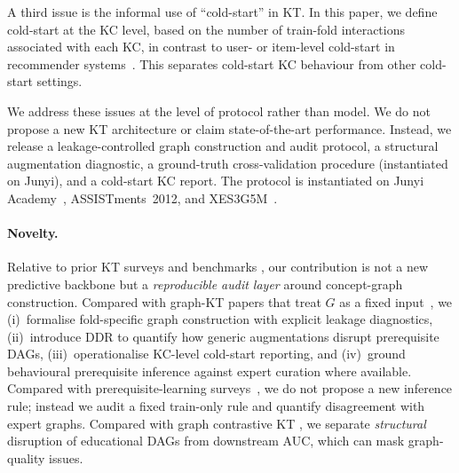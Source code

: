\documentclass[runningheads]{llncs}
\newcommand{\DDR}{\textsc{DDR}}
\begin{document}
A third issue is the informal use of ``cold-start'' in KT. In this
paper, we define cold-start at the KC level, based on the number of
train-fold interactions associated with each KC, in contrast to user- or
item-level cold-start in recommender systems~\cite{schein2002coldstart}.
This separates cold-start KC behaviour from other cold-start settings.

We address these issues at the level of protocol rather than model. We
do not propose a new KT architecture or claim state-of-the-art
performance. Instead, we release a leakage-controlled graph construction
and audit protocol, a structural augmentation diagnostic, a ground-truth
cross-validation procedure (instantiated on Junyi), and a cold-start KC
report. The protocol is instantiated on Junyi
Academy~\cite{junyi_dataset,chang2015junyi}, ASSISTments~2012, and
XES3G5M~\cite{xes3g5m2023}.

\paragraph{Novelty.}
Relative to prior KT surveys and benchmarks
\cite{abdelrahman2023kt_survey,liu2022pykt}, our contribution is not a
new predictive backbone but a \emph{reproducible audit layer} around
concept-graph construction. Compared with graph-KT papers that treat
$G$ as a fixed input~\cite{nakagawa2019gkt,tong2020skt,yang2021gikt,dygkt2024,dgekt2024}, we (i)~formalise fold-specific graph construction
with explicit leakage diagnostics, (ii)~introduce \DDR{} to quantify how
generic augmentations disrupt prerequisite DAGs, (iii)~operationalise
KC-level cold-start reporting, and (iv)~ground behavioural prerequisite
inference against expert curation where available. Compared with
prerequisite-learning surveys~\cite{bai2025survey,lin2016moocprereq,pan2020concept}, we do not propose a new inference rule; instead we
audit a fixed train-only rule and quantify disagreement with expert
graphs. Compared with graph contrastive KT
\cite{lee2022cl4kt,song2022biclkt,wan2021contrastive}, we separate
\emph{structural} disruption of educational DAGs from downstream AUC,
which can mask graph-quality issues.
\end{document}
